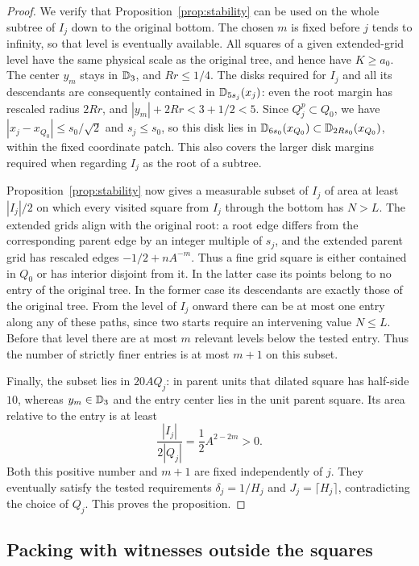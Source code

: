 \begin{proof}
We verify that Proposition~\ref{prop:stability} can be used on the
whole subtree of $I_j$ down to the original bottom. The chosen $m$ is
fixed before $j$ tends to infinity, so that level is eventually
available. All squares of a given extended-grid level have the same
physical scale as the original tree, and hence have $K\ge a_0$.
The center $y_m$ stays in $\mathbb D_3$, and $Rr\le1/4$. The disks required
for $I_j$ and all its descendants are consequently contained in
$\mathbb D_{5s_j}(x_j)$: even the root margin has rescaled radius $2Rr$,
and $|y_m|+2Rr<3+1/2<5$. Since $Q_j^p\subset Q_0$, we have
$|x_j-x_{Q_0}|\le s_0/\sqrt2$ and $s_j\le s_0$, so this disk lies in
$\mathbb D_{6s_0}(x_{Q_0})\subset\mathbb D_{2Rs_0}(x_{Q_0})$, within the fixed
coordinate patch. This also covers the larger disk margins required
when regarding $I_j$ as the root of a subtree.

Proposition~\ref{prop:stability} now gives a measurable subset of
$I_j$ of area at least $|I_j|/2$ on which every visited square from
$I_j$ through the bottom has $N>L$. The extended grids align with the
original root: a root edge differs from the corresponding parent edge
by an integer multiple of $s_j$, and the extended parent grid has
rescaled edges $-1/2+nA^{-m}$. Thus a fine grid square is either
contained in $Q_0$ or has interior disjoint from it. In the latter case
its points belong to no
entry of the original tree. In the former case its descendants are
exactly those of the original tree. From the level of $I_j$ onward
there can be at most one entry along any of these paths, since two
starts require an intervening value $N\le L$. Before that level there
are at most $m$ relevant levels below the tested entry. Thus the number
of strictly finer entries is at most $m+1$ on this subset.

Finally, the subset lies in $20A Q_j$: in parent units that dilated
square has half-side $10$, whereas $y_m\in\mathbb D_3$ and the entry center
lies in the unit parent square. Its area relative to the entry is at
least
\[
 \frac{|I_j|}{2|Q_j|}=\frac12 A^{2-2m}>0.
\]
Both this positive number and $m+1$ are fixed independently of $j$.
They eventually satisfy the tested requirements
$\delta_j=1/H_j$ and $J_j=\lceil H_j\rceil$, contradicting the choice
of $Q_j$. This proves the proposition.
\end{proof}

\subsection{Packing with witnesses outside the squares}

